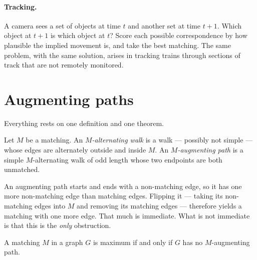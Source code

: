 \paragraph{Tracking.} A camera sees a set of objects at time $t$ and another set
at time $t+1$. Which object at $t+1$ is which object at $t$? Score each possible
correspondence by how plausible the implied movement is, and take the best
matching. The same problem, with the same solution, arises in tracking trains
through sections of track that are not remotely monitored.

\section{Augmenting paths}
\label{sec:matching-augmenting}

Everything rests on one definition and one theorem.

\begin{definition}\label{def:matching-augmenting}
Let $M$ be a matching. An \emph{$M$-alternating walk} is a walk --- possibly
not simple --- whose edges are alternately outside and inside $M$. An
\emph{$M$-augmenting path} is a simple $M$-alternating walk of odd length whose
two endpoints are both unmatched.
\end{definition}

An augmenting path starts and ends with a non-matching edge, so it has one more
non-matching edge than matching edges. Flipping it --- taking its non-matching
edges into $M$ and removing its matching edges --- therefore yields a matching
with one more edge. That much is immediate. What is not immediate is that this
is the \emph{only} obstruction.

\begin{theorem}[Berge]\label{thm:matching-berge}
A matching $M$ in a graph $G$ is maximum if and only if $G$ has no
$M$-augmenting path.
\end{theorem}

